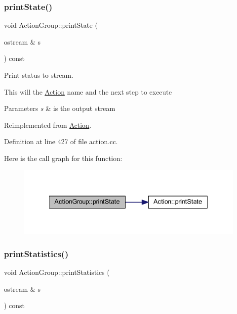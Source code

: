 \subsubsection{\texorpdfstring{printState()}{printState()}}
{\footnotesize\ttfamily void Action\+Group\+::print\+State (\begin{DoxyParamCaption}\item[{ostream \&}]{s }\end{DoxyParamCaption}) const\hspace{0.3cm}{\ttfamily [virtual]}}



Print status to stream. 

This will the \mbox{\hyperlink{class_action}{Action}} name and the next step to execute 
\begin{DoxyParams}{Parameters}
{\em s} & is the output stream \\
\hline
\end{DoxyParams}


Reimplemented from \mbox{\hyperlink{class_action_a8c64348dc5e9ad6ba914cf74aaac8bfb}{Action}}.



Definition at line 427 of file action.\+cc.

Here is the call graph for this function\+:
\nopagebreak
\begin{figure}[H]
\begin{center}
\leavevmode
\includegraphics[width=327pt]{class_action_group_af5e07efb4a443cd74b57083a0fd57c02_cgraph}
\end{center}
\end{figure}
\mbox{\label{class_action_group_ac61fd44348c6eabee0ebba16dfc4ff3b}} 
\subsubsection{\texorpdfstring{printStatistics()}{printStatistics()}}
{\footnotesize\ttfamily void Action\+Group\+::print\+Statistics (\begin{DoxyParamCaption}\item[{ostream \&}]{s }\end{DoxyParamCaption}) const\hspace{0.3cm}{\ttfamily [virtual]}}



